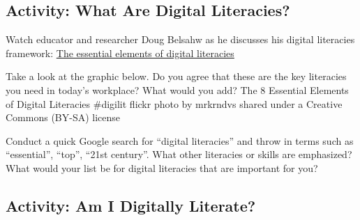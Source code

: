 \documentclass[
]{book}
\theoremstyle{definition}
\theoremstyle{definition}
\theoremstyle{definition}
\theoremstyle{definition}
\theoremstyle{remark}
\begin{document}
\hypertarget{activity-what-are-digital-literacies}{%
\subsection*{Activity: What Are Digital Literacies?}\label{activity-what-are-digital-literacies}}

\begin{reflect}
Watch educator and researcher Doug Belsahw as he discusses his digital literacies framework: \href{https://www.youtube.com/watch?v=A8yQPoTcZ78}{The essential elements of digital literacies}

Take a look at the graphic below. Do you agree that these are the key literacies you need in today's workplace? What would you add?
The 8 Essential Elements of Digital Literacies \#digilit flickr photo by mrkrndvs shared under a Creative Commons (BY-SA) license

Conduct a quick Google search for ``digital literacies'' and throw in terms such as ``essential'', ``top'', ``21st century''. What other literacies or skills are emphasized? What would your list be for digital literacies that are important for you?
\end{reflect}

\hypertarget{activity-am-i-digitally-literate}{%
\subsection*{Activity: Am I Digitally Literate?}\label{activity-am-i-digitally-literate}}
\end{document}
